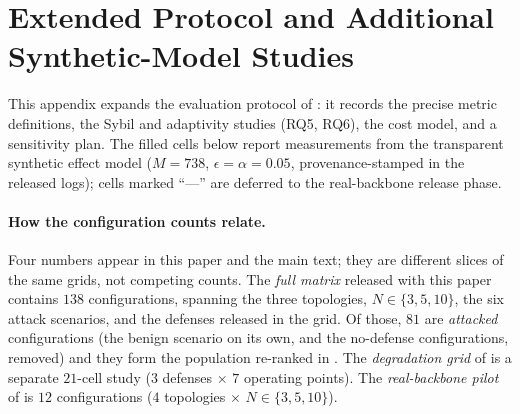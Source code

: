 \section{Extended Protocol and Additional Synthetic-Model Studies}
\label{app:experiments}

This appendix expands the evaluation protocol of : it records the
precise metric definitions, the Sybil and adaptivity studies (RQ5, RQ6), the cost model, and
a sensitivity plan. The filled cells below report measurements from the transparent
synthetic effect model ($M{=}738$, $\epsilon{=}\alpha{=}0.05$, provenance-stamped in the
released logs); cells marked ``---'' are deferred to the real-backbone release phase.

\paragraph{How the configuration counts relate.} Four numbers appear in this paper and the
main text; they are different slices of the same grids, not competing counts. The
\emph{full matrix} released with this paper contains $138$ configurations, spanning the three
topologies, $N\in\{3,5,10\}$, the six attack scenarios, and the defenses released in the grid.
Of those, $81$ are \emph{attacked} configurations (the benign scenario on its own, and the
no-defense configurations, removed) and they form the population re-ranked in
. The \emph{degradation grid} of  is a separate
$21$-cell study ($3$ defenses $\times$ $7$ operating points). The \emph{real-backbone pilot} of
 is $12$ configurations ($4$ topologies $\times$ $N\in\{3,5,10\}$).

